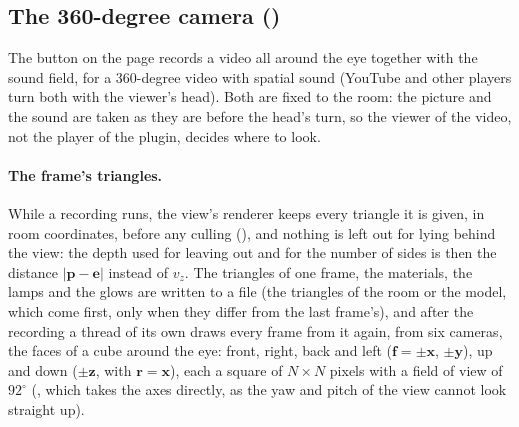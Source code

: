 \subsection{The 360-degree camera ()}
\label{sec:math-pano}
The button  on the page  records a video all around the eye together with
the sound field, for a 360-degree video with spatial sound (YouTube and other players turn both with the viewer's
head). Both are fixed to the room: the picture and the sound are taken as they are before the head's turn, so the
viewer of the video, not the player of the plugin, decides where to look.

\paragraph{The frame's triangles.} While a recording runs, the view's renderer keeps every triangle it is given, in
room coordinates, before any culling (), and nothing is left out for lying behind the view:
the depth used for leaving out and for the number of sides is then the distance $|\mathbf p - \mathbf e|$ instead of
$v_z$. The triangles of one frame, the materials, the lamps and the glows are written to a file (the triangles of
the room or the model, which come first, only when they differ from the last frame's), and after the recording a
thread of its own draws every frame from it again, from six cameras, the faces of a cube around the eye: front, right, back and left ($\mathbf f = \pm\mathbf x$,
$\pm\mathbf y$), up and down ($\pm\mathbf z$, with $\mathbf r = \mathbf x$), each a square of $N\times N$ pixels with a
field of view of $92^\circ$ (, which takes the axes directly, as the yaw and pitch of the
view cannot look straight up).

